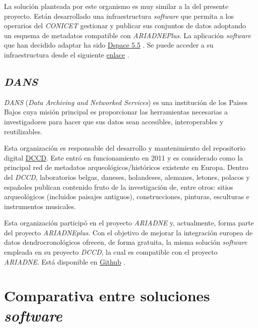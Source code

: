 La solución planteada por este organismo es muy similar a la del
presente proyecto. Están desarrollado una infraestructura
\emph{software} que permita a los operarios del \emph{CONICET} gestionar y
publicar sus conjuntos de datos adoptando un esquema de metadatos
compatible con \emph{ARIADNEPlus}. La aplicación \emph{software} que han
decidido adaptar ha sido \href{https://duraspace.org/dspace/}{Dspace
5.5} . Se puede acceder a su infraestructura desde el siguiente
\href{https://suquia.ffyh.unc.edu.ar/}{enlace} .

\subsection{\emph{DANS}}

\emph{DANS} \cite{dans:web} (\emph{Data Archiving and Networked Services}) 
es una institución de los Paises Bajos cuya misión principal es
proporcionar las herramientas necesarias a investigadores para hacer que
sus datos sean accesibles, interoperables y reutilizables.

Esta organización es responsable del desarrollo y mantenimiento del
repositorio digital \href{https://dendro.dans.knaw.nl/}{DCCD}. Este entró en funcionamiento en
2011 y es considerado como la principal red de metadatos
arqueológicos/históricos existente en Europa. Dentro del \emph{DCCD}, laboratorios belgas, daneses, holandeses,
alemanes, letones, polacos y españoles publican contenido fruto de la
investigación de, entre otros: sitios arqueológicos (incluidos paisajes
antiguos), construcciones, pinturas, esculturas e instrumentos
musicales.

Esta organización participó en el proyecto \emph{ARIADNE} y,
actualmente, forma parte del proyecto \emph{ARIADNEplus}. Con el
objetivo de mejorar la integración europea de datos dendrocronológicos
ofrecen, de forma gratuita, la misma solución \emph{software} empleada
en su proyecto \emph{DCCD}, la cual es compatible con el proyecto
\emph{ARIADNE}. Está disponible en
\href{https://github.com/DANS-KNAW/dccd-webui}{Github} .


\section{Comparativa entre soluciones \emph{software}}

